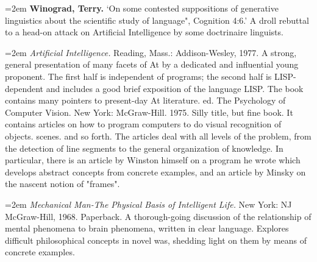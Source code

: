 \par\noindent\hangindent=2em {\bf Winograd, Terry.} `On some contested suppositions of generative linguistics about the scientific study of language", Cognition 4:6.' A droll rebuttal to a head-on attack on Artificial Intelligence by some doctrinaire linguists.

\par\noindent\hangindent=2em  {\it Artificial Intelligence.} Reading, Mass.: Addison-Wesley, 1977. A strong, general presentation of many facets of At by a dedicated and influential young proponent. The first half is independent of programs; the second half is LISP-dependent and includes a good brief exposition of the language LISP. The book contains many pointers to present-day At literature. ed. The Psychology of Computer Vision. New York: McGraw-Hill. 1975. Silly title, but fine book. It contains articles on how to program computers to do visual recognition of objects. scenes. and so forth. The articles deal with all levels of the problem, from the detection of line segments to the general organization of knowledge. In particular, there is an article by Winston himself on a program he wrote which develops abstract concepts from concrete examples, and an article by Minsky on the nascent notion of "frames".

\par\noindent\hangindent=2em  {\it Mechanical Man-The Physical Basis of Intelligent Life.} New York: NJ McGraw-Hill, 1968. Paperback. A thorough-going discussion of the relationship of mental phenomena to brain phenomena, written in clear language. Explores difficult philosophical concepts in novel was, shedding light on them by means of concrete examples.

